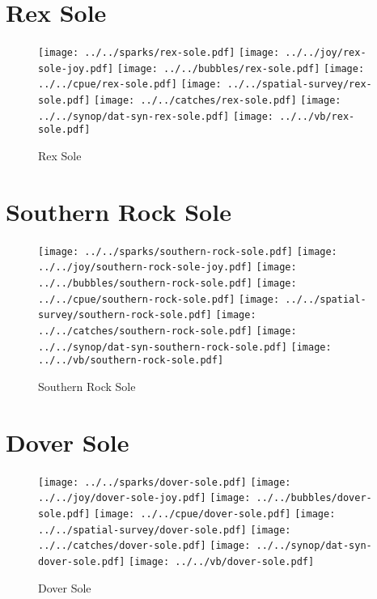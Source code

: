 \section{Rex Sole}

\begin{figure}[htbp]
\centering
\texttt{[image: ../../sparks/rex-sole.pdf]}
\texttt{[image: ../../joy/rex-sole-joy.pdf]}
\texttt{[image: ../../bubbles/rex-sole.pdf]}
\texttt{[image: ../../cpue/rex-sole.pdf]}
\texttt{[image: ../../spatial-survey/rex-sole.pdf]}
\texttt{[image: ../../catches/rex-sole.pdf]}
\texttt{[image: ../../synop/dat-syn-rex-sole.pdf]}
\texttt{[image: ../../vb/rex-sole.pdf]}
\caption{Rex Sole}
\end{figure}
\clearpage
\section{Southern Rock Sole}

\begin{figure}[htbp]
\centering
\texttt{[image: ../../sparks/southern-rock-sole.pdf]}
\texttt{[image: ../../joy/southern-rock-sole-joy.pdf]}
\texttt{[image: ../../bubbles/southern-rock-sole.pdf]}
\texttt{[image: ../../cpue/southern-rock-sole.pdf]}
\texttt{[image: ../../spatial-survey/southern-rock-sole.pdf]}
\texttt{[image: ../../catches/southern-rock-sole.pdf]}
\texttt{[image: ../../synop/dat-syn-southern-rock-sole.pdf]}
\texttt{[image: ../../vb/southern-rock-sole.pdf]}
\caption{Southern Rock Sole}
\end{figure}
\clearpage
\section{Dover Sole}

\begin{figure}[htbp]
\centering
\texttt{[image: ../../sparks/dover-sole.pdf]}
\texttt{[image: ../../joy/dover-sole-joy.pdf]}
\texttt{[image: ../../bubbles/dover-sole.pdf]}
\texttt{[image: ../../cpue/dover-sole.pdf]}
\texttt{[image: ../../spatial-survey/dover-sole.pdf]}
\texttt{[image: ../../catches/dover-sole.pdf]}
\texttt{[image: ../../synop/dat-syn-dover-sole.pdf]}
\texttt{[image: ../../vb/dover-sole.pdf]}
\caption{Dover Sole}
\end{figure}
\clearpage
